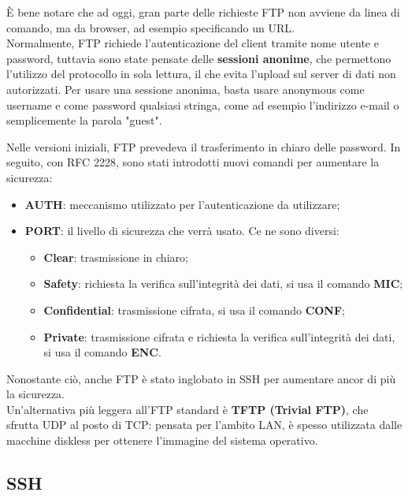         È bene notare che ad oggi, gran parte delle richieste FTP non avviene da linea di comando,
        ma da browser, ad esempio specificando un URL.\\

        Normalmente, FTP richiede l’autenticazione del client tramite nome utente e password,
        tuttavia sono state pensate delle \textbf{sessioni anonime}, che permettono l’utilizzo del protocollo in
        sola lettura, il che evita l’upload sul server di dati non autorizzati. Per usare una sessione
        anonima, basta usare anonymous come username e come password qualsiasi stringa, come ad
        esempio l’indirizzo e-mail o semplicemente la parola "guest".

        Nelle versioni iniziali, FTP prevedeva il trasferimento in chiaro delle password. In seguito, con 
        RFC 2228, sono stati introdotti nuovi comandi per aumentare la sicurezza:

        \begin{itemize}
            \item \textbf{AUTH}: meccanismo utilizzato per l’autenticazione da utilizzare;
            \item \textbf{PORT}: il livello di sicurezza che verrà usato. Ce ne sono diversi: \begin{itemize}
                \item \textbf{Clear}: trasmissione in chiaro;
                \item \textbf{Safety}: richiesta la verifica sull’integrità dei dati, si usa il comando \textbf{MIC};
                \item \textbf{Confidential}: trasmissione cifrata, si usa il comando \textbf{CONF};
                \item \textbf{Private}: trasmissione cifrata e richiesta la verifica sull’integrità dei dati, si usa il comando \textbf{ENC}.
            \end{itemize}
        \end{itemize}

        Nonostante ciò, anche FTP è stato inglobato in SSH per aumentare ancor di più la sicurezza.\\

        Un’alternativa più leggera all’FTP standard è \textbf{TFTP (Trivial FTP)}, che sfrutta UDP al posto di TCP: 
        pensata per l’ambito LAN, è spesso utilizzata dalle macchine diskless per ottenere l’immagine del sistema operativo.

    \subsection{SSH}

